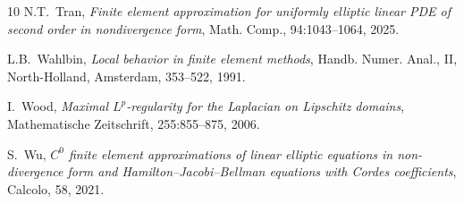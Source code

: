 \documentclass[12pt]{amsart}
\theoremstyle{definition}
\theoremstyle{remark}
\begin{document}
\begin{thebibliography}{10}
{\sc N.T.~Tran}, {\em Finite element approximation for uniformly elliptic linear PDE 
of second order in nondivergence form}, Math. Comp., 94:1043--1064, 2025.
  
{\sc L.B.~Wahlbin}, {\em Local behavior in finite element methods}, 
Handb. Numer. Anal., II, North-Holland, Amsterdam, 353--522, 1991.  

{\sc I.~Wood}, {\em Maximal $L^{p}$-regularity for the Laplacian on Lipschitz domains}, 
Mathematische Zeitschrift, 255:855--875, 2006.

{\sc S.~Wu}, {\em $C^{0}$ finite element approximations of linear elliptic equations
in non-divergence form and Hamilton–Jacobi–Bellman equations with Cordes coefficients}, Calcolo, 58, 2021.

\end{thebibliography}
\end{document}
